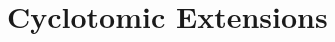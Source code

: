 \documentclass[../notes.tex]{subfiles}
\begin{document}
\section{Cyclotomic Extensions}
\end{document}
